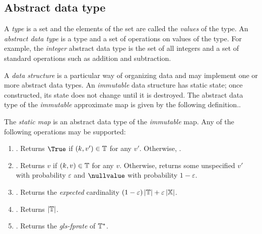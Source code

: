 \documentclass[ ../main.tex]{subfiles}
\begin{document}
\subsection{Abstract data type}
A \emph{type} is a set and the elements of the set are called the \emph{values} of the type. An \emph{abstract data type} is a type and a set of operations on values of the type. For example, the \emph{integer} abstract data type is the set of all integers and a set of standard operations such as addition and subtraction.

A \emph{data structure} is a particular way of organizing data and may implement one or more abstract data types. An \emph{immutable} data structure has static state; once constructed, its state does not change until it is destroyed. The abstract data type of the \emph{immutable} approximate map is given by the following definition..
\begin{definition}
The \emph{static map} is an abstract data type of the \emph{immutable} map. Any of the following operations may be supported:
\begin{enumerate}
    \item {}. Returns $\True$ if $(k,v') \in \mathbb{T}$ for any $v'$. Otherwise, \False.
    \item {}. Returns $v$ if $(k,v) \in \mathbb{T}$ for any $v$. Otherwise, returns some unspecified $v'$ with probability $\varepsilon$ and $\nullvalue$ with probability $1 - \varepsilon$.
    \item \Cardinality{$\Mp$}. Returns the \emph{expected} cardinality $(1 - \varepsilon) \left\vert{\mathbb{T}}\right\vert + \varepsilon \left\vert{\mathbb{X}}\right\vert$.
    \item \Count{$\Mt$}. Returns $\left\vert{\mathbb{T}}\right\vert$.
    \item \fprate{$\Mp$}. Returns the \emph{\gls{gls-fprate}} of $\Mp$.
\end{enumerate}
\end{definition}
\end{document}
